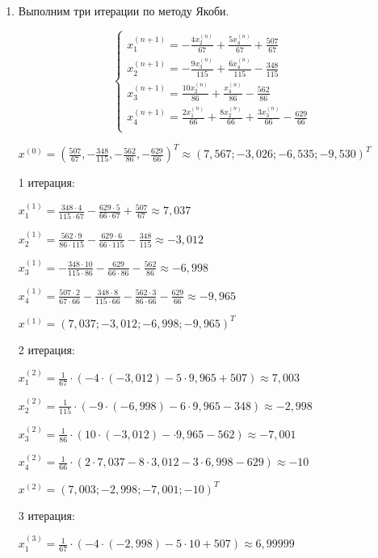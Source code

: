 \documentclass[a4paper,12pt]{article} %
\begin{document}
\begin{enumerate}
\item Выполним три итерации по методу Якоби.

\begin{equation*}
\begin{cases}
    x_1^{(n+1)} = -\frac{4x_2^{(n)}}{67} + \frac{5x_4^{(n)}}{67} + \frac{507}{67} \\
    x_2^{(n+1)} = -\frac{9x_3^{(n)}}{115} + \frac{6x_4^{(n)}}{115} - \frac{348}{115} \\
    x_3^{(n+1)} = \frac{10x_2^{(n)}}{86} + \frac{x_4^{(n)}}{86} - \frac{562}{86} \\
    x_4^{(n+1)} = \frac{2x_1^{(n)}}{66} + \frac{8x_2^{(n)}}{66} + \frac{3x_3^{(n)}}{66} - \frac{629}{66} \\
\end{cases}
\end{equation*}

$x^{(0)} = (\frac{507}{67}, -\frac{348}{115}, -\frac{562}{86}, -\frac{629}{66})^T \approx (7,567; -3,026; -6,535; -9,530)^T$

1 итерация:

$x_1^{(1)} = \frac{348 \cdot 4}{115 \cdot 67} - \frac{629 \cdot 5}{66 \cdot 67} + \frac{507}{67} \approx 7,037$

$x_2^{(1)} = \frac{562 \cdot 9}{86 \cdot 115} - \frac{629 \cdot 6}{66 \cdot 115} - \frac{348}{115} \approx -3,012$

$x_3^{(1)} = -\frac{348 \cdot 10}{115 \cdot 86} - \frac{629}{66 \cdot 86} - \frac{562}{86} \approx -6,998$

$x_4^{(1)} = \frac{507 \cdot 2}{67 \cdot 66} - \frac{348 \cdot 8}{115 \cdot 66} - \frac{562 \cdot 3}{86 \cdot 66} - \frac{629}{66} \approx -9,965$

$x^{(1)} = (7,037; -3,012; -6,998; -9,965)^T$

2 итерация:

$x_1^{(2)} = \frac{1}{67} \cdot (-4 \cdot (-3,012) - 5 \cdot 9,965 + 507) \approx 7,003$

$x_2^{(2)} = \frac{1}{115} \cdot (-9 \cdot (-6,998) - 6 \cdot 9,965 - 348) \approx -2,998$

$x_3^{(2)} = \frac{1}{86} \cdot (10 \cdot (-3,012) - \cdot 9,965 - 562) \approx -7,001$

$x_4^{(2)} = \frac{1}{66} \cdot (2 \cdot 7,037 - 8 \cdot 3,012 - 3 \cdot 6,998 - 629) \approx -10$

$x^{(2)} = (7,003; -2,998; -7,001; -10)^T$

3 итерация:

$x_1^{(3)} = \frac{1}{67} \cdot (-4 \cdot (-2,998) - 5 \cdot 10 + 507) \approx 6,99999$


\end{enumerate}
\end{document}

